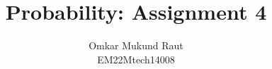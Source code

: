 \documentclass[journal,12pt,twocolumn]{IEEEtran}
\begin{document}
\newcommand*{\perm}[1][-3mu]{\permcomb[#1]{P}}
\newcommand*{\comb}[1][-1mu]{\permcomb[#1]{C}}
\providecommand{\gauss}[2]{\mathcal{N}\ensuremath{\left(#1,#2\right)}}
\newcommand{\cosec}{\,\text{cosec}\,}
\newcommand{\sinc}{\,\text{sinc}\,}
\newcommand{\rect}{\,\text{rect}\,}
\makeatletter
{}
\makeatother
\let\StandardTheFigure\thefigure
\let\vec\mathbf
\let\j\jmath
\renewcommand{\thefigure}{\theproblem}
\def\putbox#1#2#3{\makebox[0in][l]{\makebox[#1][l]{}\raisebox{\baselineskip}[0in][0in]{\raisebox{#2}[0in][0in]{#3}}}}
     \def\rightbox#1{\makebox[0in][r]{#1}}
     \def\centbox#1{\makebox[0in]{#1}}
     \def\topbox#1{\raisebox{-\baselineskip}[0in][0in]{#1}}
     \def\midbox#1{\raisebox{-0.5\baselineskip}[0in][0in]{#1}}
\vspace{3cm}
\title{
	Probability: Assignment 4
}
\author{
	Omkar Mukund Raut\\
	EM22Mtech14008
}
\maketitle
\newpage
\tableofcontents
\bigskip
\renewcommand{\thefigure}{\theenumi}
\renewcommand{\thetable}{\theenumi}
%
%		
		\numberwithin{equation}{enumi}
\end{document}
